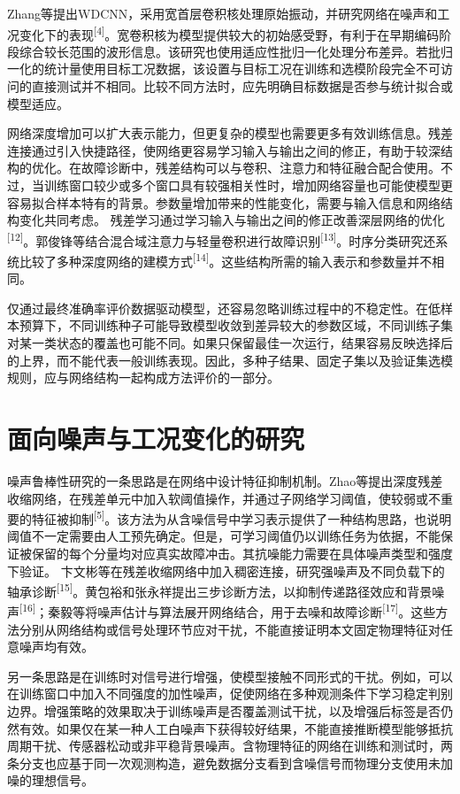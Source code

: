 \documentclass[UTF8,12pt,openany,twoside]{ctexbook}
\numberwithin{equation}{chapter}
\begin{document}
Zhang等提出WDCNN，采用宽首层卷积核处理原始振动，并研究网络在噪声和工况变化下的表现\textsuperscript{[4]}。宽卷积核为模型提供较大的初始感受野，有利于在早期编码阶段综合较长范围的波形信息。该研究也使用适应性批归一化处理分布差异。若批归一化的统计量使用目标工况数据，该设置与目标工况在训练和选模阶段完全不可访问的直接测试并不相同。比较不同方法时，应先明确目标数据是否参与统计拟合或模型适应。

网络深度增加可以扩大表示能力，但更复杂的模型也需要更多有效训练信息。残差连接通过引入快捷路径，使网络更容易学习输入与输出之间的修正，有助于较深结构的优化。在故障诊断中，残差结构可以与卷积、注意力和特征融合配合使用。不过，当训练窗口较少或多个窗口具有较强相关性时，增加网络容量也可能使模型更容易拟合样本特有的背景。参数量增加带来的性能变化，需要与输入信息和网络结构变化共同考虑。 残差学习通过学习输入与输出之间的修正改善深层网络的优化\textsuperscript{[12]}。郭俊锋等结合混合域注意力与轻量卷积进行故障识别\textsuperscript{[13]}。时序分类研究还系统比较了多种深度网络的建模方式\textsuperscript{[14]}。这些结构所需的输入表示和参数量并不相同。

仅通过最终准确率评价数据驱动模型，还容易忽略训练过程中的不稳定性。在低样本预算下，不同训练种子可能导致模型收敛到差异较大的参数区域，不同训练子集对某一类状态的覆盖也可能不同。如果只保留最佳一次运行，结果容易反映选择后的上界，而不能代表一般训练表现。因此，多种子结果、固定子集以及验证集选模规则，应与网络结构一起构成方法评价的一部分。

\section{面向噪声与工况变化的研究}\label{ux9762ux5411ux566aux58f0ux4e0eux5de5ux51b5ux53d8ux5316ux7684ux7814ux7a76}

噪声鲁棒性研究的一条思路是在网络中设计特征抑制机制。Zhao等提出深度残差收缩网络，在残差单元中加入软阈值操作，并通过子网络学习阈值，使较弱或不重要的特征被抑制\textsuperscript{[5]}。该方法为从含噪信号中学习表示提供了一种结构思路，也说明阈值不一定需要由人工预先确定。但是，可学习阈值仍以训练任务为依据，不能保证被保留的每个分量均对应真实故障冲击。其抗噪能力需要在具体噪声类型和强度下验证。 卞文彬等在残差收缩网络中加入稠密连接，研究强噪声及不同负载下的轴承诊断\textsuperscript{[15]}。黄包裕和张永祥提出三步诊断方法，以抑制传递路径效应和背景噪声\textsuperscript{[16]}；秦毅等将噪声估计与算法展开网络结合，用于去噪和故障诊断\textsuperscript{[17]}。这些方法分别从网络结构或信号处理环节应对干扰，不能直接证明本文固定物理特征对任意噪声均有效。

另一条思路是在训练时对信号进行增强，使模型接触不同形式的干扰。例如，可以在训练窗口中加入不同强度的加性噪声，促使网络在多种观测条件下学习稳定判别边界。增强策略的效果取决于训练噪声是否覆盖测试干扰，以及增强后标签是否仍然有效。如果仅在某一种人工白噪声下获得较好结果，不能直接推断模型能够抵抗周期干扰、传感器松动或非平稳背景噪声。含物理特征的网络在训练和测试时，两条分支也应基于同一次观测构造，避免数据分支看到含噪信号而物理分支使用未加噪的理想信号。
\end{document}
